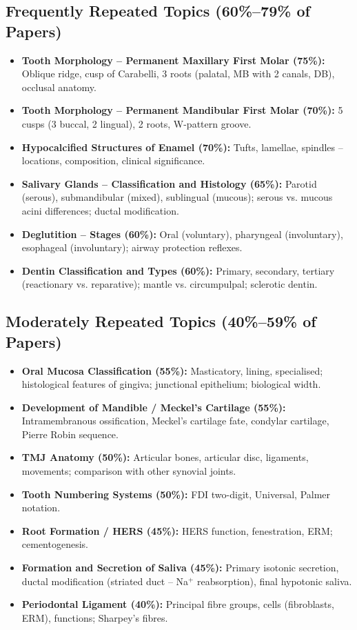 \documentclass[11pt,a4paper]{article}
\begin{document}
\subsection{Frequently Repeated Topics (60\%--79\% of Papers)}
\begin{itemize}[leftmargin=*]
    \item \textbf{Tooth Morphology -- Permanent Maxillary First Molar (75\%):} Oblique ridge, cusp of Carabelli, 3 roots (palatal, MB with 2 canals, DB), occlusal anatomy.
    \item \textbf{Tooth Morphology -- Permanent Mandibular First Molar (70\%):} 5 cusps (3 buccal, 2 lingual), 2 roots, W-pattern groove.
    \item \textbf{Hypocalcified Structures of Enamel (70\%):} Tufts, lamellae, spindles -- locations, composition, clinical significance.
    \item \textbf{Salivary Glands -- Classification and Histology (65\%):} Parotid (serous), submandibular (mixed), sublingual (mucous); serous vs. mucous acini differences; ductal modification.
    \item \textbf{Deglutition -- Stages (60\%):} Oral (voluntary), pharyngeal (involuntary), esophageal (involuntary); airway protection reflexes.
    \item \textbf{Dentin Classification and Types (60\%):} Primary, secondary, tertiary (reactionary vs. reparative); mantle vs. circumpulpal; sclerotic dentin.
\end{itemize}

\subsection{Moderately Repeated Topics (40\%--59\% of Papers)}
\begin{itemize}[leftmargin=*]
    \item \textbf{Oral Mucosa Classification (55\%):} Masticatory, lining, specialised; histological features of gingiva; junctional epithelium; biological width.
    \item \textbf{Development of Mandible / Meckel's Cartilage (55\%):} Intramembranous ossification, Meckel's cartilage fate, condylar cartilage, Pierre Robin sequence.
    \item \textbf{TMJ Anatomy (50\%):} Articular bones, articular disc, ligaments, movements; comparison with other synovial joints.
    \item \textbf{Tooth Numbering Systems (50\%):} FDI two-digit, Universal, Palmer notation.
    \item \textbf{Root Formation / HERS (45\%):} HERS function, fenestration, ERM; cementogenesis.
    \item \textbf{Formation and Secretion of Saliva (45\%):} Primary isotonic secretion, ductal modification (striated duct -- Na$^+$ reabsorption), final hypotonic saliva.
    \item \textbf{Periodontal Ligament (40\%):} Principal fibre groups, cells (fibroblasts, ERM), functions; Sharpey's fibres.
\end{itemize}
\end{document}
